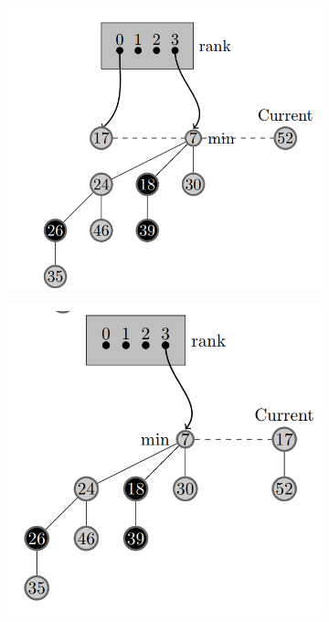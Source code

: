 \documentclass[14pt,a4paper]{report}
\begin{document}
\begin{figure}[H]
 
\begin{subfigure}[H]{0.4\textwidth}
         \centering
         \includegraphics[width=\textwidth]{e5.png}
         \caption{}
         \label{fig:e4}
     \end{subfigure}
     \hspace*{\fill}
\begin{subfigure}[H]{0.4\textwidth}
         \centering
         \includegraphics[width=\textwidth]{e6.png}
         \caption{}
         \label{fig:e6}
     \end{subfigure}


\end{figure}
\end{document}
